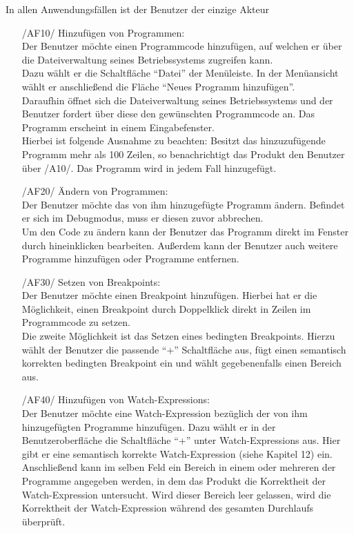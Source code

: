 \documentclass[parskip=full]{scrartcl}
\begin{document}
In allen Anwendungsfällen ist der Benutzer der einzige Akteur

\begin{itemize}
    \item [/AF10/] Hinzufügen von Programmen:\\ 
	Der Benutzer möchte einen Programmcode hinzufügen, auf welchen er über die Dateiverwaltung
	seines Betriebssystems zugreifen kann.\\
	Dazu wählt er die Schaltfläche \enquote{Datei} der Menüleiste. In der Menüansicht wählt er anschließend die Fläche \enquote{Neues Programm hinzufügen}.\\
	Daraufhin öffnet sich die Dateiverwaltung seines Betriebssystems und der Benutzer fordert über diese den gewünschten Programmcode an.
	Das Programm erscheint in einem Eingabefenster.\\
	Hierbei ist folgende Ausnahme zu beachten: Besitzt das hinzuzufügende Programm mehr als 100 Zeilen, so benachrichtigt das Produkt den Benutzer über /A10/. Das Programm wird in jedem Fall hinzugefügt.\\
    
    \item [/AF20/] Ändern von Programmen:\\
    Der Benutzer möchte das von ihm hinzugefügte Programm ändern. Befindet er sich im \gls{Debugmodus}, muss er diesen zuvor abbrechen. \\
    Um den Code zu ändern kann der Benutzer das Programm direkt im Fenster durch hineinklicken bearbeiten. Außerdem kann der Benutzer auch weitere Programme hinzufügen oder Programme entfernen.
    
    \item [/AF30/] Setzen von Breakpoints:\\
    Der Benutzer möchte einen \gls{Breakpoint} hinzufügen. Hierbei hat er die Möglichkeit, einen \gls{Breakpoint} durch Doppelklick direkt in Zeilen im Programmcode zu setzen.\\
    Die zweite Möglichkeit ist das Setzen eines bedingten Breakpoints. Hierzu wählt der Benutzer die passende \enquote{+} Schaltfläche aus, fügt einen semantisch korrekten bedingten Breakpoint ein und wählt gegebenenfalls einen Bereich aus.
    
    \item [/AF40/] Hinzufügen von Watch-Expressions:\\
    Der Benutzer möchte eine \gls{Watch-Expression} bezüglich der von ihm hinzugefügten Programme hinzufügen. Dazu wählt er in der Benutzeroberfläche die Schaltfläche \enquote{+} unter \glspl{Watch-Expression} aus. Hier gibt er eine semantisch korrekte \gls{Watch-Expression} (siehe Kapitel 12) ein. Anschließend kann im selben Feld ein Bereich in einem oder mehreren der Programme angegeben werden, in dem das Produkt die Korrektheit der \gls{Watch-Expression} untersucht. Wird dieser Bereich leer gelassen, wird die Korrektheit der \gls{Watch-Expression} während des gesamten Durchlaufs überprüft.
    

\end{itemize}
\end{document}
